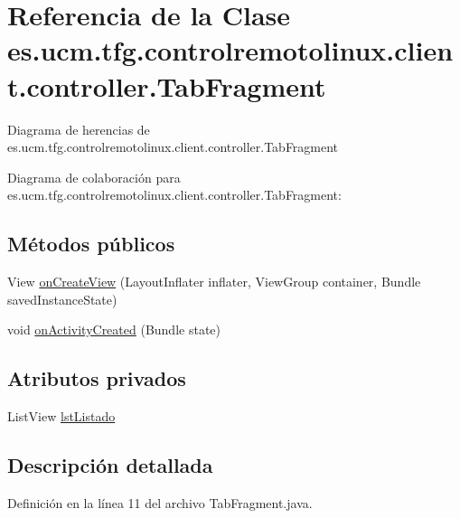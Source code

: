 \hypertarget{classes_1_1ucm_1_1tfg_1_1controlremotolinux_1_1client_1_1controller_1_1TabFragment}{\section{Referencia de la Clase es.\-ucm.\-tfg.\-controlremotolinux.\-client.\-controller.\-Tab\-Fragment}
\label{classes_1_1ucm_1_1tfg_1_1controlremotolinux_1_1client_1_1controller_1_1TabFragment}
}


Diagrama de herencias de es.\-ucm.\-tfg.\-controlremotolinux.\-client.\-controller.\-Tab\-Fragment


Diagrama de colaboración para es.\-ucm.\-tfg.\-controlremotolinux.\-client.\-controller.\-Tab\-Fragment\-:
\subsection*{Métodos públicos}
\begin{DoxyCompactItemize}
\item 
View \hyperlink{classes_1_1ucm_1_1tfg_1_1controlremotolinux_1_1client_1_1controller_1_1TabFragment_a5233814df53faa3a664e980e6c3d64ec}{on\-Create\-View} (Layout\-Inflater inflater, View\-Group container, Bundle saved\-Instance\-State)
\item 
void \hyperlink{classes_1_1ucm_1_1tfg_1_1controlremotolinux_1_1client_1_1controller_1_1TabFragment_ac233a93b2f8c64d4a141c67fa3013c00}{on\-Activity\-Created} (Bundle state)
\end{DoxyCompactItemize}
\subsection*{Atributos privados}
\begin{DoxyCompactItemize}
\item 
List\-View \hyperlink{classes_1_1ucm_1_1tfg_1_1controlremotolinux_1_1client_1_1controller_1_1TabFragment_aa760860103fdc80e525a91729fc8a50b}{lst\-Listado}
\end{DoxyCompactItemize}


\subsection{Descripción detallada}


Definición en la línea 11 del archivo Tab\-Fragment.\-java.



